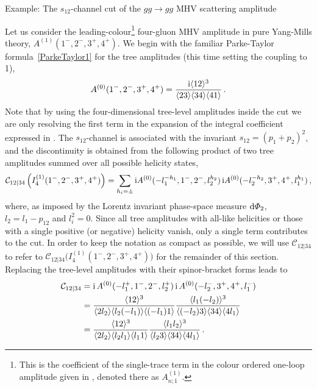 \begin{example}{Example: The $s_{12}$-channel cut of the $gg\to gg$ MHV scattering amplitude}

  Let us consider the leading-colour\footnote{This is the coefficient of the single-trace term in the colour ordered one-loop amplitude given in , denoted there as $A^{(1)}_{n;1}.$} four-gluon MHV amplitude in
pure Yang-Mills theory, $A^{(1)}(1^-,2^-,3^+,4^+)$. We begin with the familiar
Parke-Taylor formula~\eqref{ParkeTaylor1} for the tree amplitudes (this time setting the coupling to 1),
\begin{equation}
  A^{(0)}(1^-,2^-,3^+,4^+) = \frac{\mathrm{i} \langle 1 2 \rangle^3}{\langle 2 3 \rangle\langle 3 4 \rangle\langle 4 1 \rangle} \,.
  \label{eq:4gtree}
\end{equation}
Note that by using the four-dimensional tree-level amplitudes inside the cut we are only resolving the first term in the expansion of the integral coefficient expressed in .
The $s_{12}$-channel is associated with the invariant $s_{12} = (p_1+p_2)^2$, and the discontinuity
is obtained from the following product of two tree amplitudes summed over all possible
helicity states,
\begin{equation}
  \mathcal{C}_{12|34}\left( I_4^{(1)}(1^-,2^-,3^+,4^+) \right) = \sum_{h_i=\pm} \mathrm{i} A^{(0)}(-l_1^{-h_1},1^-,2^-,l_2^{h_2}) \, \mathrm{i} A^{(0)}(-l_2^{-h_2},3^+,4^+,l_1^{h_1}) \,,
  \label{eq:4gschannelintegrand}
\end{equation}
where, as imposed by the Lorentz invariant phase-space measure $\d\Phi_2$,
$l_2=l_1-p_{12}$ and $l_i^2=0$. Since all tree amplitudes with all-like
helicities or those with a single positive (or negative) helicity vanish, only
a single term contributes to the cut. In order to keep the notation as compact
as possible, we will use $\mathcal{C}_{12|34}$ to refer to
$\mathcal{C}_{12|34}\bigl(I_4^{(1)}(1^-,2^-,3^+,4^+)\bigr)$ 
for the remainder of this section. Replacing the tree-level amplitudes with their spinor-bracket forms leads to
\begin{align}
  \mathcal{C}_{12|34} & = \mathrm{i} \, A^{(0)}(-l_1^{+},1^-,2^-,l_2^{+}) \, \mathrm{i} \, A^{(0)}(-l_2^{-},3^+,4^+,l_1^{-}) \nonumber\\
  &= \frac{\langle 1 2 \rangle^3}{\langle 2 l_2 \rangle\langle l_2 (-l_1) \rangle\langle (-l_1) 1 \rangle} \frac{\langle l_1 (-l_2) \rangle^3}{\langle (-l_2) 3 \rangle\langle 3 4 \rangle\langle 4 l_1 \rangle} \nonumber\\
  \label{eq:C12|34YM}
  &= \frac{\langle 1 2 \rangle^3}{\langle 2 l_2 \rangle\langle l_2 l_1 \rangle\langle l_1 1 \rangle} \frac{\langle l_1 l_2 \rangle^3}{\langle l_2 3 \rangle\langle 3 4 \rangle\langle 4 l_1 \rangle} \,.
\end{align}

\end{example}
